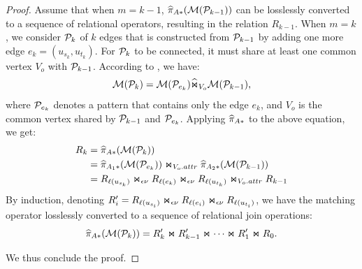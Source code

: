\begin{proof}
Assume that when $m = k-1$, $\widehat{\pi}_{A*}(\mathcal{M}(\mathcal{P}_{k-1}))$ can be losslessly converted to a sequence of relational operators, resulting in the relation $R_{k-1}$. When $m = k$, we consider $\mathcal{P}_{k}$ of $k$ edges that is constructed from $\mathcal{P}_{k-1}$ by adding one more edge $e_k = (u_{s_k}, u_{t_k})$. For $\mathcal{P}_{k}$ to be connected, it must share at least one common vertex $V_o$ with $\mathcal{P}_{k-1}$. According to , we have:
\[ \mathcal{M}(\mathcal{P}_{k}) =  \mathcal{M}(\mathcal{P}_{e_k}) \widehat{\Join}_{V_o} \mathcal{M}(\mathcal{P}_{k-1}), \]
where $\mathcal{P}_{e_k}$ denotes a pattern that contains only the edge $e_k$, and $V_o$ is the common vertex shared by $\mathcal{P}_{k-1}$ and $\mathcal{P}_{e_k}$. Applying $\widehat{\pi}_{A*}$ to the above equation, we get:
\begin{equation*}
\begin{split}
R_k &= \widehat{\pi}_{A*}(\mathcal{M}(\mathcal{P}_{k})) \\
    &= \widehat{\pi}_{A_1*}(\mathcal{M}(\mathcal{P}_{e_k})) \Join_{V_o.attr}  \widehat{\pi}_{A_2*}(\mathcal{M}(\mathcal{P}_{k-1})) \\
    &= {R_{\mathcal{\ell}(u_{s_k})}} \Join_{\epsilon\nu} {R_{\mathcal{\ell}(e_k)}} \Join_{\epsilon\nu} {R_{\mathcal{\ell}(u_{t_k})}} \Join_{V_o.attr} R_{k-1}
\end{split}
\end{equation*}
By induction, denoting $R'_i = {R_{\mathcal{\ell}(u_{s_i})}} \Join_{\epsilon\nu} {R_{\mathcal{\ell}(e_i)}} \Join_{\epsilon\nu} {R_{\mathcal{\ell}(u_{t_i})}}$, we have the matching operator losslessly converted to a sequence of relational join operations:
\begin{equation}
    \label{eq:graph-agnostic}
    \widehat{\pi}_{A*}(\mathcal{M}(\mathcal{P}_{k})) = R'_k \Join R'_{k-1} \Join \cdots \Join R'_1 \Join R_0.
\end{equation}

We thus conclude the proof.
\end{proof}




